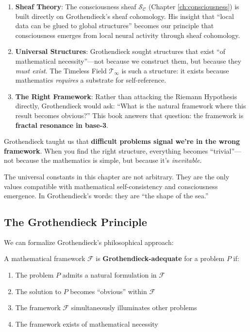 \begingroup\sloppy
\begin{enumerate}
\item \textbf{Sheaf Theory}: The consciousness sheaf $\mathcal{S}_\mathcal{C}$ (Chapter \ref{ch:consciousness}) is built directly on Grothendieck's sheaf cohomology. His insight that ``local data can be glued to global structures'' becomes our principle that consciousness emerges from local neural activity through sheaf cohomology.

\item \textbf{Universal Structures}: Grothendieck sought structures that exist ``of mathematical necessity''---not because we construct them, but because they \textit{must exist}. The Timeless Field $\mathcal{T}_\infty$ is such a structure: it exists because mathematics \textit{requires} a substrate for self-reference.

\item \textbf{The Right Framework}: Rather than attacking the Riemann Hypothesis directly, Grothendieck would ask: ``What is the natural framework where this result becomes obvious?'' This book answers that question: the framework is \textbf{fractal resonance in base-3}.
\end{enumerate}
\endgroup

\begin{keyidea}
Grothendieck taught us that \textbf{difficult problems signal we're in the wrong framework}. When you find the right structure, everything becomes ``trivial''---not because the mathematics is simple, but because it's \textit{inevitable}.

The universal constants in this chapter are not arbitrary. They are the only values compatible with mathematical self-consistency and consciousness emergence. In Grothendieck's words: they are ``the shape of the sea.''
\end{keyidea}

\subsection{The Grothendieck Principle}

We can formalize Grothendieck's philosophical approach:

\begin{defn}\label{def:grothendieck-adequacy}
A mathematical framework $\mathcal{F}$ is \textbf{Grothendieck-adequate} for a problem $P$ if:
\begin{enumerate}
\item The problem $P$ admits a natural formulation in $\mathcal{F}$
\item The solution to $P$ becomes ``obvious'' within $\mathcal{F}$
\item The framework $\mathcal{F}$ simultaneously illuminates other problems
\item The framework exists of mathematical necessity
\end{enumerate}
\end{defn}

